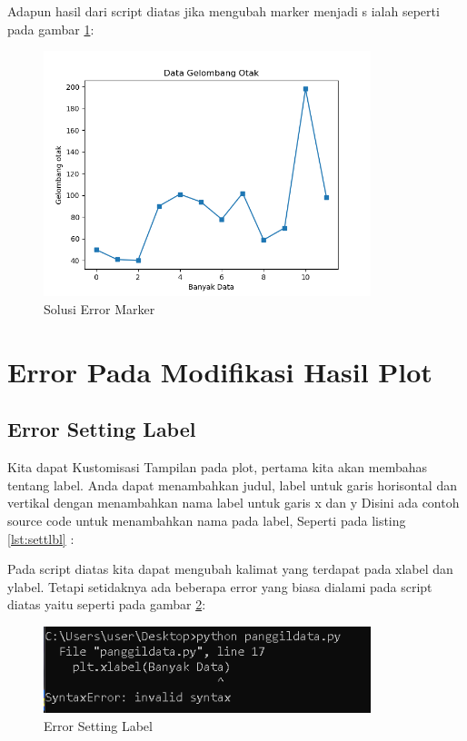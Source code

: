 Adapun hasil dari script diatas jika mengubah marker menjadi s ialah seperti pada gambar \ref{fig:solem}:
\begin{figure}[!htbp]
	\centerline{\includegraphics[width=0.85\textwidth]{figures/6/solem.PNG}}
	\caption{Solusi Error Marker}
	\label{fig:solem}
\end{figure}  

\section{Error Pada Modifikasi Hasil Plot}
\subsection{Error Setting Label} 
Kita dapat Kustomisasi Tampilan pada plot, pertama kita akan membahas tentang label. Anda dapat menambahkan judul, label untuk garis horisontal dan vertikal dengan menambahkan nama label untuk garis x dan y
Disini ada contoh source code untuk menambahkan nama pada label, Seperti pada listing \ref{lst:settlbl} : 


Pada script diatas kita dapat mengubah kalimat yang terdapat pada xlabel dan ylabel. 
Tetapi setidaknya ada beberapa error yang biasa dialami pada script diatas yaitu seperti pada gambar \ref{fig:errsetlbl}:
\begin{figure}[!htbp]
	\centerline{\includegraphics[width=0.85\textwidth]{figures/6/errsetlbl.PNG}}
	\caption{Error Setting Label}
	\label{fig:errsetlbl}
\end{figure}  

